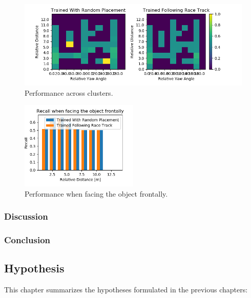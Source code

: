 \begin{figure}
	\includegraphics[width=\textwidth]{fig/recall_yaw}
	\caption{Performance across clusters.}
	\label{fig:recall_yaw}
\end{figure}
\begin{figure}
	\centering
	\includegraphics[width=0.5\textwidth]{fig/recall_front}
	\caption{Performance when facing the object frontally.}
	\label{fig:recall_front}
\end{figure}

\subsubsection{Discussion}

\subsubsection{Conclusion}


\subsection{Hypothesis}
\label{sec:training:hypothesis}

This chapter summarizes the hypotheses formulated in the previous chapters:

